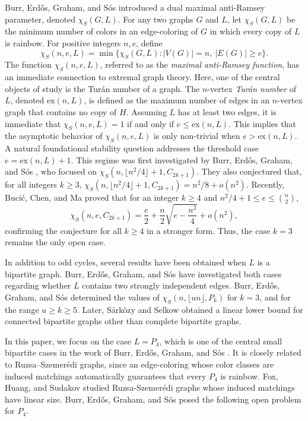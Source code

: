 \documentclass[11pt,a4paper]{article}
\newcommand{\chiS}{\chi_S}
\begin{document}
Burr, Erd\H{o}s, Graham, and S\'{o}s \cite{Bur2} introduced a dual maximal anti-Ramsey parameter, denoted $\chi_S(G,L)$.  
For any two graphs $G$ and $L$, let $\chi_S(G,L)$ be the minimum number of colors in an edge-coloring of $G$ in which every copy of $L$ is rainbow.  
For positive integers $n,e$, define
\[
\chiS(n,e,L)=\min\{\chiS(G,L): |V(G)|=n,\ |E(G)|\ge e\}.
\]
The function $\chi_S(n,e,L)$, referred to as the \emph{maximal anti-Ramsey function},  has an immediate connection to extremal graph theory. Here, one of the central objects of study is the Turán number of a graph. The $n$-vertex \textit{Turán number} of $L$, denoted $\mathrm{ex}(n,L)$, is defined as the maximum number of edges in an $n$-vertex graph that contains no copy of $H$. Assuming $L$ has at least two edges, it is immediate that $\chiS(n,e,L) = 1$ if and only if $e \le \mathrm{ex}(n,L)$. This implies that the asymptotic behavior of $\chi_S(n,e,L)$ is only non-trivial when $e > \mathrm{ex}(n,L)$. A natural foundational stability question addresses the threshold case $e = \mathrm{ex}(n,L)+1$. This regime was first investigated  by  Burr, Erd\H{o}s, Graham, and S\'{o}s \cite{Bur2}, who focused on $\chi_S\left(n, \lfloor n^2/4 \rfloor + 1, C_{2k+1}\right)$.
They also conjectured that, for all integers $k \ge 3$,
$
\chi_S\left(n, \lfloor n^2/4 \rfloor + 1, C_{2k+1}\right) = n^2/8 + o(n^2).
$
Recently, Buci\'{c}, Chen, and Ma \cite{Buc} proved that for an integer $k \ge 4$ and $n^2/4 + 1 \le e \le \binom{n}{2}$,
\[
\chi_S\left(n,e,C_{2k+1}\right) = \frac{e}{2} + \frac{n}{2}\sqrt{e - \frac{n^2}{4}} + o(n^2),
\]
confirming the conjecture for all $k \ge 4$ in a stronger form. Thus, the case $k = 3$ remains the only open case.




In addition to odd cycles, several results have been obtained when $L$ is a bipartite graph. Burr, Erd\H{o}s, Graham, and S\'{o}s \cite{Bur1} have investigated both cases regarding whether $L$ contains two strongly independent edges. Burr, Erdős, Graham, and Sós \cite{Bur2} determined the values of $\chi_S(n, \lfloor un \rfloor, P_k)$ for $k=3$, and for the range $u \ge k \ge 5$. Later, Sárközy and Selkow \cite{Sar} obtained a linear lower bound for connected bipartite graphs other than complete bipartite graphs.

In this paper, we focus on the case $L = P_4$, which is one of the central small bipartite cases in the work of Burr, Erd\H{o}s, Graham, and S\'{o}s \cite{Bur2}. It is closely related to Ruzsa–Szemerédi graphs, since an edge-coloring whose color classes are induced matchings automatically guarantees that every $P_4$ is rainbow. Fox, Huang, and Sudakov \cite{Fox} studied Ruzsa-Szemerédi graphs whose induced matchings have linear size.
Burr, Erd\H{o}s, Graham, and S\'{o}s \cite{Bur2} posed the following  open problem for $P_4$.
\end{document}
